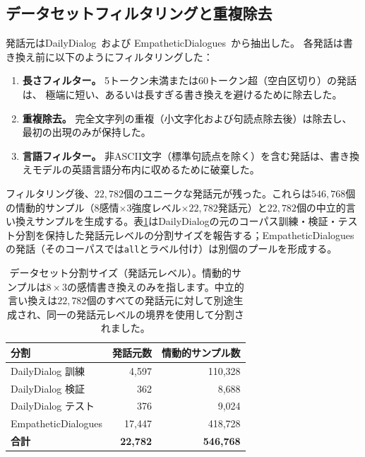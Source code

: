 \subsection{データセットフィルタリングと重複除去}

発話元はDailyDialog~\cite{li2017dailydialogmanuallylabelledmultiturn}および
EmpatheticDialogues~\cite{rashkin2019empatheticopendomainconversationmodels}から抽出した。
各発話は書き換え前に以下のようにフィルタリングした：

\begin{enumerate}
  \item \textbf{長さフィルター。} 5トークン未満または60トークン超（空白区切り）の発話は、
    極端に短い、あるいは長すぎる書き換えを避けるために除去した。
  \item \textbf{重複除去。} 完全文字列の重複（小文字化および句読点除去後）は除去し、最初の出現のみが保持した。
  \item \textbf{言語フィルター。} 非ASCII文字（標準句読点を除く）を含む発話は、書き換えモデルの英語言語分布内に収めるために破棄した。
\end{enumerate}

フィルタリング後、$22{,}782$個のユニークな発話元が残った。これらは$546{,}768$個の情動的サンプル（$8$感情$\times$$3$強度レベル$\times$$22{,}782$発話元）と$22{,}782$個の中立的言い換えサンプルを生成する。表\ref{tab:dataset_split}はDailyDialogの元のコーパス訓練・検証・テスト分割を保持した発話元レベルの分割サイズを報告する；EmpatheticDialoguesの発話（そのコーパスでは\texttt{all}とラベル付け）は別個のプールを形成する。

\begin{table}[htbp]
\centering
\begin{tabular}{lrr}
\hline
\textbf{分割} & \textbf{発話元数} & \textbf{情動的サンプル数} \\
\hline
DailyDialog 訓練      & 4{,}597 & 110{,}328 \\
DailyDialog 検証 & 362     &   8{,}688 \\
DailyDialog テスト       & 376     &   9{,}024 \\
EmpatheticDialogues    & 17{,}447 & 418{,}728 \\
\hline
\textbf{合計} & \textbf{22{,}782} & \textbf{546{,}768} \\
\hline
\end{tabular}
\caption{データセット分割サイズ（発話元レベル）。情動的サンプルは$8{\times}3$の感情書き換えのみを指します。中立的言い換えは$22{,}782$個のすべての発話元に対して別途生成され、同一の発話元レベルの境界を使用して分割されました。}
\label{tab:dataset_split}
\end{table}

